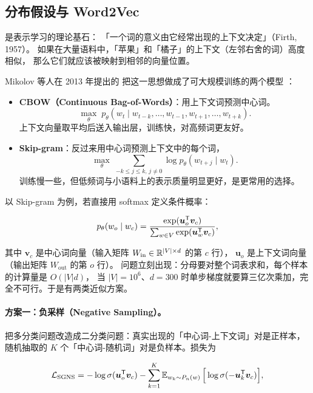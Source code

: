 \subsection{分布假设与 Word2Vec}

 是表示学习的理论基石：
「一个词的意义由它经常出现的上下文决定」（Firth, 1957）。
如果在大量语料中，「苹果」和「橘子」的上下文（左邻右舍的词）高度相似，
那么它们就应该被映射到相邻的向量位置。

Mikolov 等人在 2013 年提出的  把这一思想做成了可大规模训练的两个模型
\cite{mikolov2013word2vec}：

\begin{itemize}
  \item \textbf{CBOW（Continuous Bag-of-Words）}：用上下文词预测中心词。
        $$\max_\theta \; p_\theta(w_t \mid w_{t-k}, \dots, w_{t-1}, w_{t+1}, \dots, w_{t+k}).$$
        上下文向量取平均后送入输出层，训练快，对高频词更友好。
  \item \textbf{Skip-gram}：反过来用中心词预测上下文中的每个词，
        $$\max_\theta \; \sum_{-k \le j \le k,\, j \ne 0} \log p_\theta(w_{t+j} \mid w_t).$$
        训练慢一些，但低频词与小语料上的表示质量明显更好，是更常用的选择。
\end{itemize}

以 Skip-gram 为例，若直接用 softmax 定义条件概率：

\begin{equation}
p_\theta(w_o \mid w_c) = \frac{\exp(\bm{u}_{o}^{\mathsf{T}} \bm{v}_{c})}{\sum_{w \in V} \exp(\bm{u}_{w}^{\mathsf{T}} \bm{v}_{c})},
\label{eq:softmax-full}
\end{equation}

其中 $\bm{v}_c$ 是中心词向量（输入矩阵 $W_{\text{in}} \in \mathbb{R}^{|V| \times d}$ 的第 $c$ 行），
$\bm{u}_o$ 是上下文词向量（输出矩阵 $W_{\text{out}}$ 的第 $o$ 行）。
问题立刻出现：分母要对整个词表求和，每个样本的计算量是 $O(|V| d)$，
当 $|V| = 10^6$、$d = 300$ 时单步梯度就要算三亿次乘加，完全不可行。于是有两类近似方案。

\paragraph{方案一：负采样（Negative Sampling）。}
把多分类问题改造成二分类问题：真实出现的「中心词-上下文词」对是正样本，
随机抽取的 $K$ 个「中心词-随机词」对是负样本。损失为

\begin{equation}
\mathcal{L}_{\text{SGNS}} = -\log \operatorname{\sigma}(\bm{u}_{o}^{\mathsf{T}} \bm{v}_{c})
- \sum_{k=1}^{K} \operatorname{\mathbb{E}}_{w_k \sim P_n(w)} \Big[ \log \operatorname{\sigma}(-\bm{u}_{k}^{\mathsf{T}} \bm{v}_{c}) \Big],
\label{eq:word2vec-neg}
\end{equation}

